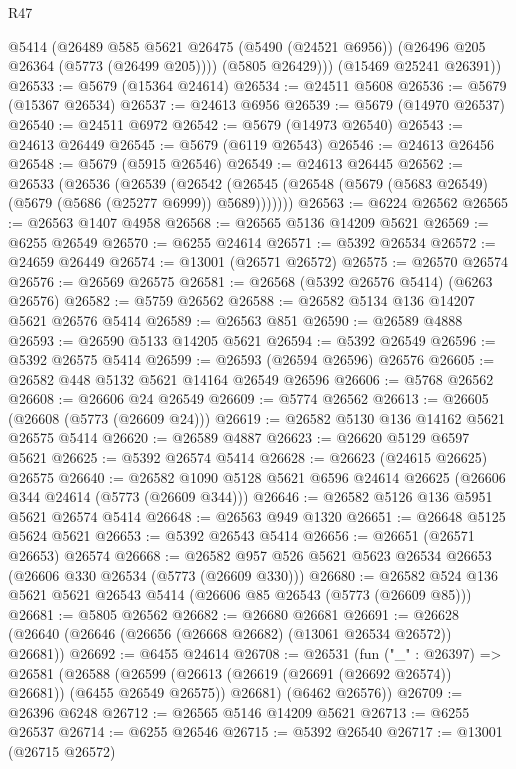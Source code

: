 \begin{lexlean}{R47}
\begin{coremodule}
          @5414
          (@26489
            @585
            @5621
            @26475
            (@5490 (@24521 @6956))
            (@26496 @205 @26364 (@5773 (@26499 @205))))
          (@5805 @26429)))
      (@15469 @25241 @26391))
@26533 := @5679 (@15364 @24614)
@26534 := @24511 @5608
@26536 := @5679 (@15367 @26534)
@26537 := @24613 @6956
@26539 := @5679 (@14970 @26537)
@26540 := @24511 @6972
@26542 := @5679 (@14973 @26540)
@26543 := @24613 @26449
@26545 := @5679 (@6119 @26543)
@26546 := @24613 @26456
@26548 := @5679 (@5915 @26546)
@26549 := @24613 @26445
@26562 := @26533
    (@26536
      (@26539
        (@26542 (@26545 (@26548 (@5679 (@5683 @26549) (@5679 (@5686 (@25277 @6999)) @5689)))))))
@26563 := @6224 @26562
@26565 := @26563 @1407 @4958
@26568 := @26565 @5136 @14209 @5621
@26569 := @6255 @26549
@26570 := @6255 @24614
@26571 := @5392 @26534
@26572 := @24659 @26449
@26574 := @13001 (@26571 @26572)
@26575 := @26570 @26574
@26576 := @26569 @26575
@26581 := @26568 (@5392 @26576 @5414) (@6263 @26576)
@26582 := @5759 @26562
@26588 := @26582 @5134 @136 @14207 @5621 @26576 @5414
@26589 := @26563 @851
@26590 := @26589 @4888
@26593 := @26590 @5133 @14205 @5621
@26594 := @5392 @26549
@26596 := @5392 @26575 @5414
@26599 := @26593 (@26594 @26596) @26576
@26605 := @26582 @448 @5132 @5621 @14164 @26549 @26596
@26606 := @5768 @26562
@26608 := @26606 @24 @26549
@26609 := @5774 @26562
@26613 := @26605 (@26608 (@5773 (@26609 @24)))
@26619 := @26582 @5130 @136 @14162 @5621 @26575 @5414
@26620 := @26589 @4887
@26623 := @26620 @5129 @6597 @5621
@26625 := @5392 @26574 @5414
@26628 := @26623 (@24615 @26625) @26575
@26640 := @26582 @1090 @5128 @5621 @6596 @24614 @26625 (@26606 @344 @24614 (@5773 (@26609 @344)))
@26646 := @26582 @5126 @136 @5951 @5621 @26574 @5414
@26648 := @26563 @949 @1320
@26651 := @26648 @5125 @5624 @5621
@26653 := @5392 @26543 @5414
@26656 := @26651 (@26571 @26653) @26574
@26668 := @26582 @957 @526 @5621 @5623 @26534 @26653 (@26606 @330 @26534 (@5773 (@26609 @330)))
@26680 := @26582 @524 @136 @5621 @5621 @26543 @5414 (@26606 @85 @26543 (@5773 (@26609 @85)))
@26681 := @5805 @26562
@26682 := @26680 @26681
@26691 := @26628 (@26640 (@26646 (@26656 (@26668 @26682) (@13061 @26534 @26572)) @26681))
@26692 := @6455 @24614
@26708 := @26531
    (fun ("_" : @26397) =>
    @26581
      (@26588
        (@26599 (@26613 (@26619 (@26691 (@26692 @26574)) @26681)) (@6455 @26549 @26575))
        @26681)
      (@6462 @26576))
@26709 := @26396 @6248
@26712 := @26565 @5146 @14209 @5621
@26713 := @6255 @26537
@26714 := @6255 @26546
@26715 := @5392 @26540
@26717 := @13001 (@26715 @26572)

\end{coremodule}
\end{lexlean}
